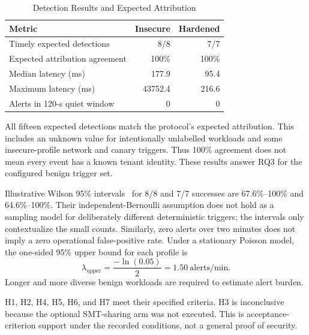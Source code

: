 \documentclass[conference,letterpaper]{IEEEtran}
\begin{document}
\begin{table}[t]
\caption{Detection Results and Expected Attribution}
\label{tab:detection}
\centering
\footnotesize
\renewcommand{\arraystretch}{1.15}
\begin{tabular}{@{}p{}rr@{}}
\toprule
Metric & Insecure & Hardened \\ \midrule
Timely expected detections & 8/8 & 7/7 \\
Expected attribution agreement & 100\% & 100\% \\
Median latency (ms) & 177.9 & 95.4 \\
Maximum latency (ms) & 43752.4 & 216.6 \\
Alerts in 120-s quiet window & 0 & 0 \\
\bottomrule
\end{tabular}
\end{table}

All fifteen expected detections match the protocol's expected attribution. This includes an unknown value for intentionally unlabelled workloads and some insecure-profile network and canary triggers. Thus 100\% agreement does not mean every event has a known tenant identity. These results answer RQ3 for the configured benign trigger set.

Illustrative Wilson 95\% intervals~\cite{wilson} for 8/8 and 7/7 successes are 67.6\%--100\% and 64.6\%--100\%. Their independent-Bernoulli assumption does not hold as a sampling model for deliberately different deterministic triggers; the intervals only contextualize the small counts. Similarly, zero alerts over two minutes does not imply a zero operational false-positive rate. Under a stationary Poisson model, the one-sided 95\% upper bound for each profile is
\begin{equation}
\lambda_{\mathrm{upper}}=\frac{-\ln(0.05)}{2}=1.50\ \mathrm{alerts/min}.
\end{equation}
Longer and more diverse benign workloads are required to estimate alert burden.

H1, H2, H4, H5, H6, and H7 meet their specified criteria. H3 is inconclusive because the optional SMT-sharing arm was not executed. This is acceptance-criterion support under the recorded conditions, not a general proof of security.
\end{document}
